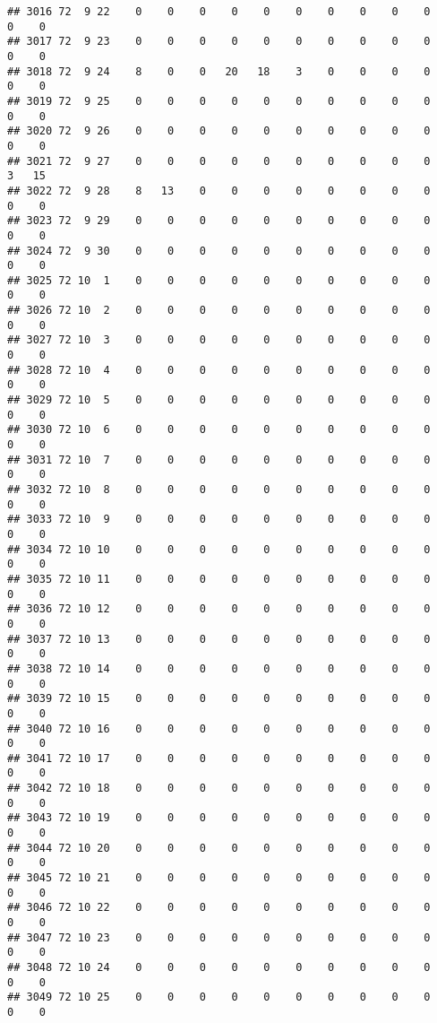 \documentclass[]{article}
\begin{document}
\begin{verbatim}
## 3016 72  9 22    0    0    0    0    0    0    0    0    0    0    0    0
## 3017 72  9 23    0    0    0    0    0    0    0    0    0    0    0    0
## 3018 72  9 24    8    0    0   20   18    3    0    0    0    0    0    0
## 3019 72  9 25    0    0    0    0    0    0    0    0    0    0    0    0
## 3020 72  9 26    0    0    0    0    0    0    0    0    0    0    0    0
## 3021 72  9 27    0    0    0    0    0    0    0    0    0    0    3   15
## 3022 72  9 28    8   13    0    0    0    0    0    0    0    0    0    0
## 3023 72  9 29    0    0    0    0    0    0    0    0    0    0    0    0
## 3024 72  9 30    0    0    0    0    0    0    0    0    0    0    0    0
## 3025 72 10  1    0    0    0    0    0    0    0    0    0    0    0    0
## 3026 72 10  2    0    0    0    0    0    0    0    0    0    0    0    0
## 3027 72 10  3    0    0    0    0    0    0    0    0    0    0    0    0
## 3028 72 10  4    0    0    0    0    0    0    0    0    0    0    0    0
## 3029 72 10  5    0    0    0    0    0    0    0    0    0    0    0    0
## 3030 72 10  6    0    0    0    0    0    0    0    0    0    0    0    0
## 3031 72 10  7    0    0    0    0    0    0    0    0    0    0    0    0
## 3032 72 10  8    0    0    0    0    0    0    0    0    0    0    0    0
## 3033 72 10  9    0    0    0    0    0    0    0    0    0    0    0    0
## 3034 72 10 10    0    0    0    0    0    0    0    0    0    0    0    0
## 3035 72 10 11    0    0    0    0    0    0    0    0    0    0    0    0
## 3036 72 10 12    0    0    0    0    0    0    0    0    0    0    0    0
## 3037 72 10 13    0    0    0    0    0    0    0    0    0    0    0    0
## 3038 72 10 14    0    0    0    0    0    0    0    0    0    0    0    0
## 3039 72 10 15    0    0    0    0    0    0    0    0    0    0    0    0
## 3040 72 10 16    0    0    0    0    0    0    0    0    0    0    0    0
## 3041 72 10 17    0    0    0    0    0    0    0    0    0    0    0    0
## 3042 72 10 18    0    0    0    0    0    0    0    0    0    0    0    0
## 3043 72 10 19    0    0    0    0    0    0    0    0    0    0    0    0
## 3044 72 10 20    0    0    0    0    0    0    0    0    0    0    0    0
## 3045 72 10 21    0    0    0    0    0    0    0    0    0    0    0    0
## 3046 72 10 22    0    0    0    0    0    0    0    0    0    0    0    0
## 3047 72 10 23    0    0    0    0    0    0    0    0    0    0    0    0
## 3048 72 10 24    0    0    0    0    0    0    0    0    0    0    0    0
## 3049 72 10 25    0    0    0    0    0    0    0    0    0    0    0    0

\end{verbatim}
\end{document}
